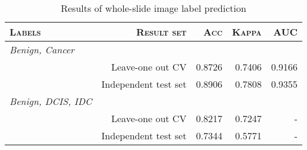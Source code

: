 
    \begin{table}[h]
    \renewcommand{\arraystretch}{1.1}
    \caption{Results of whole-slide image label prediction}
    \label{table_results_single_label}
    \centering
    \begin{tabular}{|lrrrr|}
    \hline
    \textsc{Labels}&\textsc{Result set}&\textsc{Acc}&\textsc{Kappa}&\textsc{AUC}\\
    \hline
    \textit{Benign, Cancer}&&&&\\
    &Leave-one out CV&0.8726&0.7406&0.9166 \\
    &Independent test set&0.8906&0.7808&0.9355 \\
    \textit{Benign, DCIS, IDC}&&&&\\
    &Leave-one out CV&0.8217&0.7247&- \\
    &Independent test set&0.7344&0.5771&- \\
    \hline

    \end{tabular}
    \end{table}

    